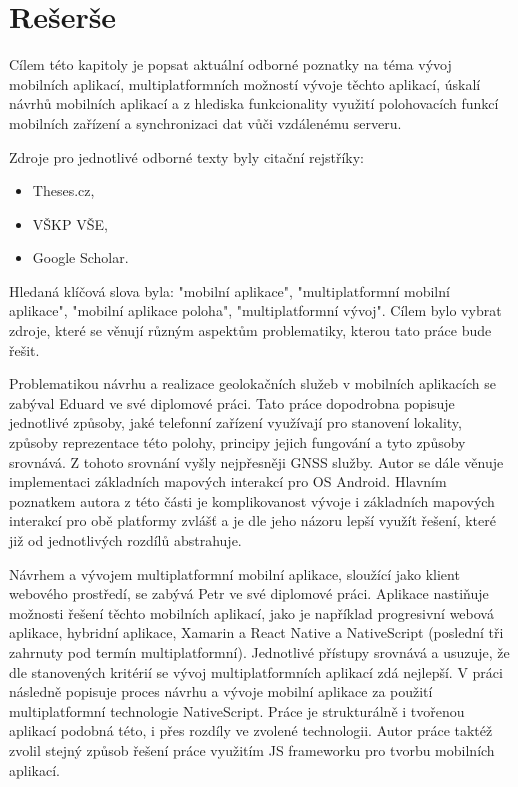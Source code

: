 \section*{Rešerše}

Cílem této kapitoly je popsat aktuální odborné poznatky na téma vývoj mobilních aplikací, multiplatformních možností vývoje těchto aplikací, úskalí návrhů mobilních aplikací a z hlediska funkcionality využití polohovacích funkcí mobilních zařízení a synchronizaci dat vůči vzdálenému serveru.

Zdroje pro jednotlivé odborné texty byly citační rejstříky:

\begin{itemize}
	\item Theses.cz,
	\item VŠKP VŠE,
	\item Google Scholar.
\end{itemize}

Hledaná klíčová slova byla: "mobilní aplikace", "multiplatformní mobilní aplikace", "mobilní aplikace poloha", "multiplatformní vývoj". Cílem bylo vybrat zdroje, které se věnují různým aspektům problematiky, kterou tato práce bude řešit.

Problematikou návrhu a realizace geolokačních služeb v mobilních aplikacích se zabýval Eduard  \textcite{Bakes2018thesis} ve své diplomové práci. Tato práce dopodrobna popisuje jednotlivé způsoby, jaké telefonní zařízení využívají pro stanovení lokality, způsoby reprezentace této polohy, principy jejich fungování a tyto způsoby srovnává. Z tohoto srovnání vyšly nejpřesněji GNSS služby. Autor se dále věnuje implementaci základních mapových interakcí pro OS Android. Hlavním poznatkem autora z této části je komplikovanost vývoje i základních mapových interakcí pro obě platformy zvlášť a je dle jeho názoru lepší využít řešení, které již od jednotlivých rozdílů abstrahuje.


Návrhem a vývojem multiplatformní mobilní aplikace, sloužící jako klient webového prostředí, se zabývá Petr \textcite{Domkar2018} ve své diplomové práci. Aplikace nastiňuje možnosti řešení těchto mobilních aplikací, jako je například progresivní webová aplikace, hybridní aplikace, Xamarin a React Native a NativeScript (poslední tři zahrnuty pod termín multiplatformní). Jednotlivé přístupy srovnává a usuzuje, že dle stanovených kritérií se vývoj multiplatformních aplikací zdá nejlepší. V práci následně popisuje proces návrhu a vývoje mobilní aplikace za použití multiplatformní technologie NativeScript. Práce je strukturálně i tvořenou aplikací podobná této, i přes rozdíly ve zvolené technologii. Autor práce taktéž zvolil stejný způsob řešení práce využitím JS frameworku pro tvorbu mobilních aplikací.

